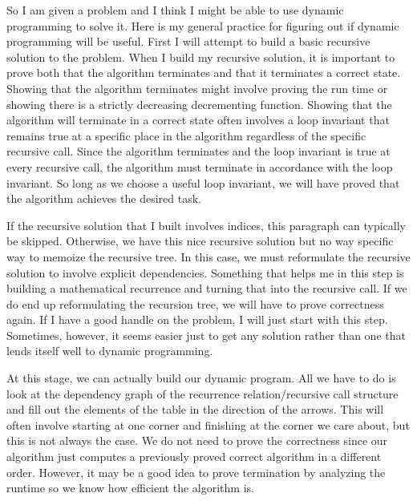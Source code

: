 \documentclass{article}
\begin{document}
So I am given a problem and I think I might be able to use dynamic programming to solve it.
Here is my general practice for figuring out if dynamic programming will be useful.
First I will attempt to build a basic recursive solution to the problem.
When I build my recursive solution, it is important to prove both that the algorithm terminates and that it terminates a correct state.
Showing that the algorithm terminates might involve proving the run time or showing there is a strictly decreasing decrementing function.
Showing that the algorithm will terminate in a correct state often involves a loop invariant that remains true at a specific place in the algorithm regardless of the specific recursive call.
Since the algorithm terminates and the loop invariant is true at every recursive call, the algorithm must terminate in accordance with the loop invariant.
So long as we choose a useful loop invariant, we will have proved that the algorithm achieves the desired task.

If the recursive solution that I built involves indices, this paragraph can typically be skipped.
Otherwise, we have this nice recursive solution but no way specific way to memoize the recursive tree.
In this case, we must reformulate the recursive solution to involve explicit dependencies.
Something that helps me in this step is building a mathematical recurrence and turning that into the recursive call.
If we do end up reformulating the recursion tree, we will have to prove correctness again.
If I have a good handle on the problem, I will just start with this step.
Sometimes, however, it seems easier just to get any solution rather than one that lends itself well to dynamic programming.

At this stage, we can actually build our dynamic program.
All we have to do is look at the dependency graph of the recurrence relation/recursive call structure and fill out the elements of the table in the direction of the arrows.
This will often involve starting at one corner and finishing at the corner we care about, but this is not always the case.
We do not need to prove the correctness since our algorithm just computes a previously proved correct algorithm in a different order.
However, it may be a good idea to prove termination by analyzing the runtime so we know how efficient the algorithm is.




\nextprob
{}
\end{document}
